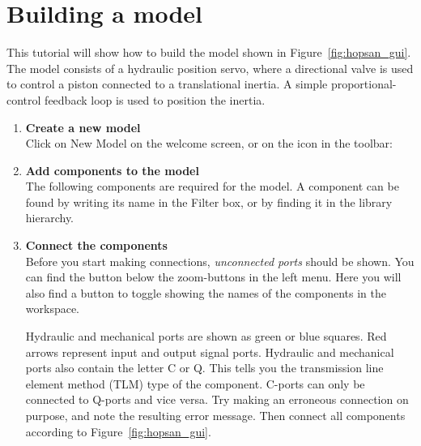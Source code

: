 \documentclass[a4paper,pdftex]{article}
\begin{document}
\section*{Building a model}
This tutorial will show how to build the model shown in Figure~\ref{fig:hopsan_gui}.
The model consists of a hydraulic position servo, where a directional valve is used to control a piston connected to a translational inertia.
A simple proportional-control feedback loop is used to position the inertia.
\begin{enumerate}
\item \textbf{Create a new model} \\
Click on New Model on the welcome screen, or on the icon in the toolbar:
 	
 	
\item \textbf{Add components to the model} \\
The following components are required for the model.
A component can be found by writing its name in the Filter box, or by finding it in the library hierarchy.

\vspace{5pt}
\vspace{5pt}

\item \textbf{Connect the components} \\
Before you start making connections, \emph{unconnected ports} should be shown. 
You can find the button below the zoom-buttons in the left menu. 
Here you will also find a button to toggle showing the names of the components in the workspace.


Hydraulic and mechanical ports are shown as green or blue squares.
Red arrows represent input and output signal ports.
Hydraulic and mechanical ports also contain the letter C or Q.
This tells you the transmission line element method (TLM) type of the component.
C-ports can only be connected to Q-ports and vice versa.
Try making an erroneous connection on purpose, and note the resulting error message.
Then connect all components according to Figure~\ref{fig:hopsan_gui}.


\end{enumerate}
\end{document}
